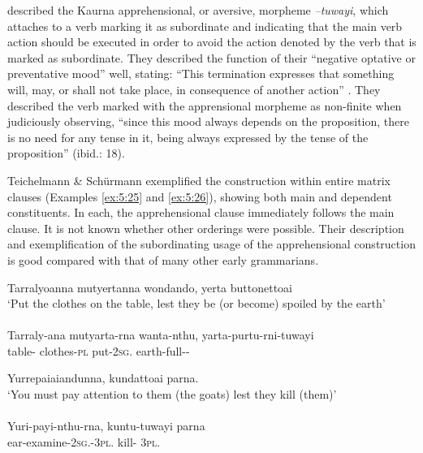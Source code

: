 \citet[18--19]{teichelmann_outlines_1840} described the Kaurna apprehensional, or aversive, morpheme \textit{–tuwayi}, which attaches to a verb marking it as subordinate and indicating that the main verb action should be executed in order to avoid the action denoted by the verb that is marked as subordinate. They described the function of their “negative optative or preventative mood” well, stating: “This termination expresses that something will, may, or shall not take place, in consequence of another action” \citep[18]{teichelmann_outlines_1840}. They described the verb marked with the apprensional morpheme as non-finite when judiciously observing, “since this mood always depends on the proposition, there is no need for any tense in it, being always expressed by the tense of the proposition” (ibid.: 18).

Teichelmann \& Schürmann exemplified the construction within entire matrix clauses (Examples \ref{ex:5:25} and \ref{ex:5:26}), showing both main and dependent constituents. In each, the apprehensional clause immediately follows the main clause. It is not known whether other orderings were possible. Their description and exemplification of the subordinating usage of the apprehensional construction is good compared with that of many other early grammarians. 

\ea\label{ex:5:25}
Tarralyoanna   mutyertanna    wondando,		 yerta   buttonettoai \\
\glt `Put the clothes on the table, lest they be (or become) spoiled by the earth'\\
\citep[18]{teichelmann_outlines_1840} \\
\gll Tarraly-ana    mutyarta-rna         wanta-nthu,\footnotemark{}	 yarta-purtu-rni-tuwayi \\
 table-     clothes-\textsc{pl}              put-2\textsc{sg}.              earth-full--                            \\
\z



\ea\label{ex:5:26}
Yurrepaiaiandunna,                           kundattoai             parna. \\
\glt `You must pay attention to them (the goats) lest they kill (them)' \\
\citep[18]{teichelmann_outlines_1840} \\
\gll Yuri-payi-nthu-rna,     		kuntu-tuwayi	  parna\\
ear-examine-2\textsc{sg}.-3\textsc{pl}.	kill-	  3\textsc{pl}.\\
\z

